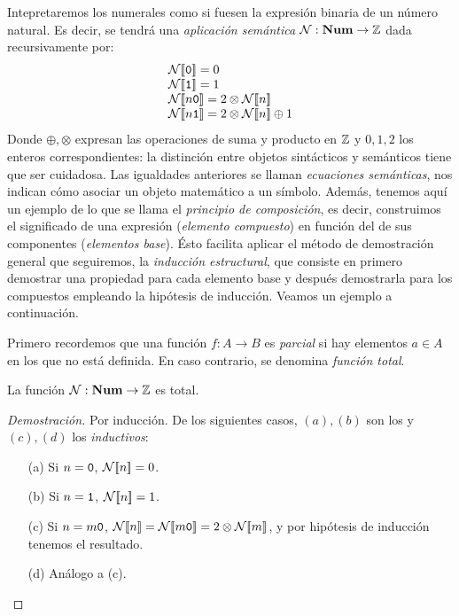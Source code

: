 Intepretaremos los numerales como si fuesen la expresión binaria de un número natural. Es decir, se tendrá una \textit{aplicación semántica} $\mathcal{N}: \mathbf{Num} \to \mathbb{Z}$ dada recursivamente por:
\[
    \begin{array}{l}
         \fc{\mc{N}}{\n{0}} = 0 \\
         \fc{\mc{N}}{\n{1}}= 1 \\
         \fc{\mc{N}}{n \n{0}} = 2\otimes \fc{\mc{N}}{n}\\
         \fc{\mc{N}}{n \n{1}} = 2\otimes \fc{\mc{N}}{n} \oplus 1
    \end{array}
\]
Donde $\oplus, \otimes$ expresan las operaciones de suma y producto en $\mathbb{Z}$ y $0, 1, 2$ los enteros correspondientes: la distinción entre objetos sintácticos y semánticos tiene que ser cuidadosa. Las igualdades anteriores se llaman \textit{ecuaciones semánticas}, nos indican cómo asociar un objeto matemático a un símbolo. Además, tenemos aquí un ejemplo de lo que se llama el \textit{principio de composición}, es decir, construimos el significado de una expresión (\textit{elemento compuesto}) en función del de sus componentes (\textit{elementos base}). Ésto facilita aplicar el método de demostración general que seguiremos, la \textit{inducción estructural}, que consiste en primero demostrar una propiedad para cada elemento base y después demostrarla para los compuestos empleando la hipótesis de inducción. Veamos un ejemplo a continuación.

Primero recordemos que una función $f: A \rightarrow B$ es \textit{parcial} si hay elementos $a\in A$ en los que no está definida. En caso contrario, se denomina \textit{función total}.

\begin{prop}
La función $\mathcal{N}: \mathbf{Num} \to \mathbb{Z}$ es total.
\end{prop}
\begin{proof}[Demostración]
Por inducción. De los siguientes casos, $(a), (b)$ son los  y $(c), (d)$ los \textit{inductivos}:
\begin{itemize}
    \item[(a)] Si $n = \texttt{0}$, $\mathcal{N}[\![n]\!] = 0$.
    \item[(b)] Si $n = \texttt{1}$, $\mathcal{N}[\![n]\!] = 1$.
    \item[(c)] Si $n = m\texttt{0}$, $\mathcal{N}[\![n]\!] = \mathcal{N}[\![m\texttt{0}]\!] = 2 \otimes \mathcal{N}[\![m]\!]$, y por hipótesis de inducción tenemos el resultado.
    \item[(d)] Análogo a (c).
\end{itemize}
\end{proof}

